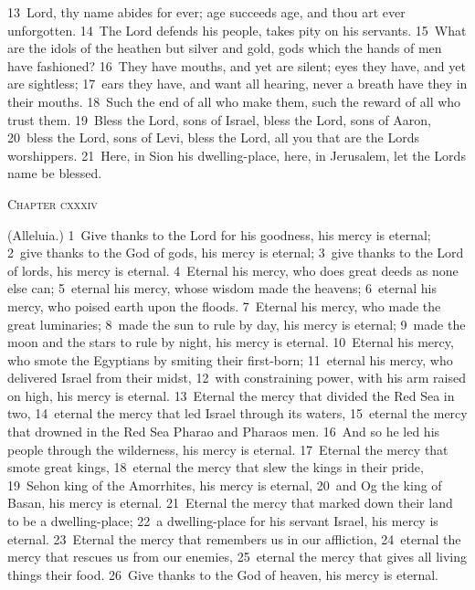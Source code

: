 \documentclass[10pt]{book} %
\begin{document}
\textcolor{benred8}{13}~Lord, thy name abides for ever; age succeeds age, and thou art ever unforgotten. \textcolor{benred8}{14}~The Lord defends his people, takes pity on his servants. \textcolor{benred8}{15}~What are the idols of the heathen but silver and gold, gods which the hands of men have fashioned? \textcolor{benred8}{16}~They have mouths, and yet are silent; eyes they have, and yet are sightless; \textcolor{benred8}{17}~ears they have, and want all hearing, never a breath have they in their mouths. \textcolor{benred8}{18}~Such the end of all who make them, such the reward of all who trust them. \textcolor{benred8}{19}~Bless the Lord, sons of Israel, bless the Lord, sons of Aaron, \textcolor{benred8}{20}~bless the Lord, sons of Levi, bless the Lord, all you that are the Lord\textquotesingle s worshippers. \textcolor{benred8}{21}~Here, in Sion his dwelling-place, here, in Jerusalem, let the Lord\textquotesingle s name be blessed.
\begin{large}\begin{center}\textsc{Chapter cxxxiv}\end{center}\end{large}
(Alleluia.)
\textcolor{benred8}{1}~Give thanks to the Lord for his goodness, his mercy is eternal; \textcolor{benred8}{2}~give thanks to the God of gods, his mercy is eternal; \textcolor{benred8}{3}~give thanks to the Lord of lords, his mercy is eternal. \textcolor{benred8}{4}~Eternal his mercy, who does great deeds as none else can; \textcolor{benred8}{5}~eternal his mercy, whose wisdom made the heavens; \textcolor{benred8}{6}~eternal his mercy, who poised earth upon the floods. \textcolor{benred8}{7}~Eternal his mercy, who made the great luminaries; \textcolor{benred8}{8}~made the sun to rule by day, his mercy is eternal; \textcolor{benred8}{9}~made the moon and the stars to rule by night, his mercy is eternal.
\textcolor{benred8}{10}~Eternal his mercy, who smote the Egyptians by smiting their first-born; \textcolor{benred8}{11}~eternal his mercy, who delivered Israel from their midst, \textcolor{benred8}{12}~with constraining power, with his arm raised on high, his mercy is eternal. \textcolor{benred8}{13}~Eternal the mercy that divided the Red Sea in two, \textcolor{benred8}{14}~eternal the mercy that led Israel through its waters, \textcolor{benred8}{15}~eternal the mercy that drowned in the Red Sea Pharao and Pharao\textquotesingle s men. \textcolor{benred8}{16}~And so he led his people through the wilderness, his mercy is eternal.
\textcolor{benred8}{17}~Eternal the mercy that smote great kings, \textcolor{benred8}{18}~eternal the mercy that slew the kings in their pride, \textcolor{benred8}{19}~Sehon king of the Amorrhites, his mercy is eternal, \textcolor{benred8}{20}~and Og the king of Basan, his mercy is eternal. \textcolor{benred8}{21}~Eternal the mercy that marked down their land to be a dwelling-place; \textcolor{benred8}{22}~a dwelling-place for his servant Israel, his mercy is eternal. \textcolor{benred8}{23}~Eternal the mercy that remembers us in our affliction, \textcolor{benred8}{24}~eternal the mercy that rescues us from our enemies, \textcolor{benred8}{25}~eternal the mercy that gives all living things their food. \textcolor{benred8}{26}~Give thanks to the God of heaven, his mercy is eternal.
\end{document}
